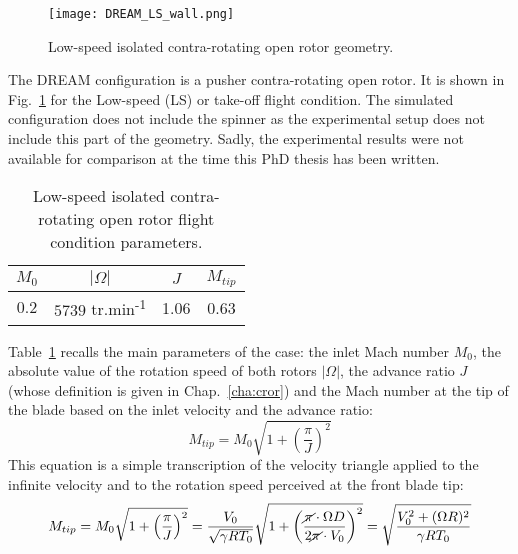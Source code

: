 

\begin{figure}[htb]
  \centering
  \texttt{[image: DREAM\_LS\_wall.png]}
  \caption{Low-speed isolated contra-rotating open rotor geometry.}
  \label{fig:dream_ls_wall}
\end{figure}

The DREAM configuration is a pusher contra-rotating open rotor.
It is shown in Fig.~\ref{fig:dream_ls_wall} for the
Low-speed (LS) or take-off flight condition. 
The simulated configuration does not include the spinner as the
experimental setup does not include this part of the geometry.
Sadly, the experimental results were not available for comparison
at the time this PhD thesis has been written.

\begin{table}[htb]
   \centering
  \begin{tabular}{cccc}
    \toprule
    $M_0$ & $|\Omega|$ & $J$ & $M_{tip}$ \\
    \midrule
    $0.2$ & $5739$ tr.min\textsuperscript{-1} & 1.06 & 0.63 \\
    \bottomrule
  \end{tabular}
  \caption{Low-speed isolated contra-rotating open rotor flight condition parameters.}
  \label{tab:dream_ls_flight_condition}
\end{table} 
Table~\ref{tab:dream_ls_flight_condition} recalls the main
parameters of the case: the inlet Mach number $M_0$,
the absolute value of the rotation speed of both rotors $|\Omega|$,
the advance ratio $J$ (whose definition is given in Chap.~\ref{cha:cror})
and the Mach number at the tip of
the blade based on the inlet velocity and the advance ratio:
\begin{equation}
	M_{tip} = M_0 \sqrt{1 + \left(\frac{\pi}{J} \right)^2}
\end{equation}
This equation is a simple transcription of the velocity triangle
applied to the infinite velocity and to the rotation speed perceived
at the front blade tip:
\begin{equation}
    M_{tip} = M_0 \sqrt{1 + \left(\frac{\pi}{J}\right)^2} = 
    \frac{V_0}{\sqrt{\gamma R T_0}} \sqrt{1 + \left(\frac{
    	\cancel{\pi} \cdot \Omega D}{
    	2 \cancel{\pi} \cdot V_0}\right)^2} =
    \sqrt{\frac{V_0^2 + (\Omega R)^2}{\gamma R T_0}}
    \label{eq:m_tip_explained}
\end{equation}
